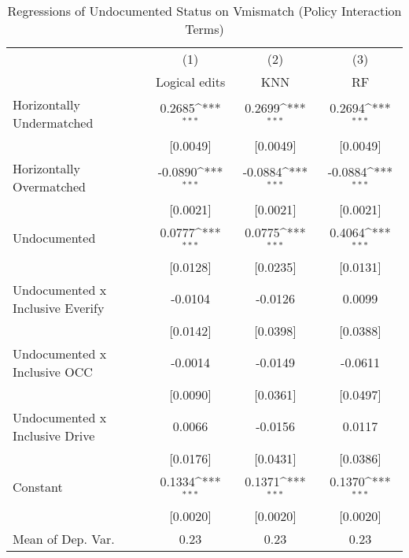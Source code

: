 \begin{table}[htbp]\centering
\def\sym#1{\ifmmode^{#1}\else\(^{#1}\)\fi}
\caption{Regressions of Undocumented Status on Vmismatch (Policy Interaction Terms)}
\begin{tabular}{l*{3}{c}}
\toprule
                    &\multicolumn{1}{c}{(1)}         &\multicolumn{1}{c}{(2)}         &\multicolumn{1}{c}{(3)}         \\
                    &Logical edits         &         KNN         &          RF         \\
\midrule
Horizontally Undermatched&      0.2685\sym{***}&      0.2699\sym{***}&      0.2694\sym{***}\\
                    &    [0.0049]         &    [0.0049]         &    [0.0049]         \\
\addlinespace
Horizontally Overmatched&     -0.0890\sym{***}&     -0.0884\sym{***}&     -0.0884\sym{***}\\
                    &    [0.0021]         &    [0.0021]         &    [0.0021]         \\
\addlinespace
Undocumented        &      0.0777\sym{***}&      0.0775\sym{***}&      0.4064\sym{***}\\
                    &    [0.0128]         &    [0.0235]         &    [0.0131]         \\
\addlinespace
Undocumented x Inclusive Everify&     -0.0104         &     -0.0126         &      0.0099         \\
                    &    [0.0142]         &    [0.0398]         &    [0.0388]         \\
\addlinespace
Undocumented x Inclusive OCC&     -0.0014         &     -0.0149         &     -0.0611         \\
                    &    [0.0090]         &    [0.0361]         &    [0.0497]         \\
\addlinespace
Undocumented x Inclusive Drive&      0.0066         &     -0.0156         &      0.0117         \\
                    &    [0.0176]         &    [0.0431]         &    [0.0386]         \\
\addlinespace
Constant            &      0.1334\sym{***}&      0.1371\sym{***}&      0.1370\sym{***}\\
                    &    [0.0020]         &    [0.0020]         &    [0.0020]         \\
\midrule
Mean of Dep. Var.   &        0.23         &        0.23         &        0.23         \\

\end{tabular}
\end{table}
